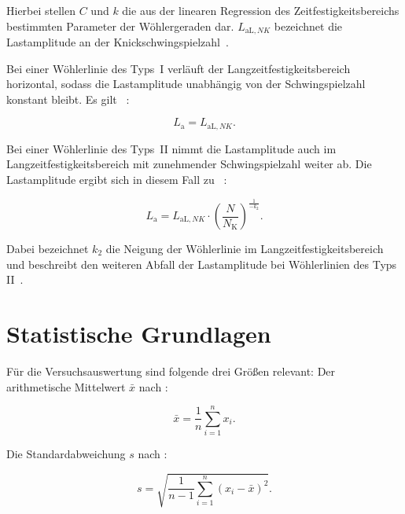Hierbei stellen \(C\) und \(k\) die aus der linearen Regression des Zeitfestigkeitsbereichs bestimmten Parameter der Wöhlergeraden dar. \(L_{\text{aL},NK}\) bezeichnet die Lastamplitude an der Knickschwingspielzahl~\cite[Seite~62]{DIN50100}.

Bei einer Wöhlerlinie des Typs~I verläuft der Langzeitfestigkeitsbereich horizontal, sodass die Lastamplitude unabhängig von der Schwingspielzahl konstant bleibt. Es gilt ~\cite[Seite~105]{DIN50100}:

\begin{equation} \label{eq:La_TypI} 
    L_{\text{a}} = L_{\text{aL},NK}.
\end{equation}

Bei einer Wöhlerlinie des Typs~II nimmt die Lastamplitude auch im Langzeitfestigkeitsbereich mit zunehmender Schwingspielzahl weiter ab. Die Lastamplitude ergibt sich in diesem Fall zu ~\cite[Seite~105]{DIN50100}:

\begin{equation} \label{eq:La_TypII} 
    L_{\text{a}} = L_{\text{aL},NK} \cdot \left(\frac{N}{N_{\text{K}}}\right)^{\frac{1}{-k_2}}.
\end{equation}

Dabei bezeichnet \(k_2\) die Neigung der Wöhlerlinie im Langzeitfestigkeitsbereich und beschreibt den weiteren Abfall der Lastamplitude bei Wöhlerlinien des Typs II~\cite[Seite~105]{DIN50100}.

\clearpage

	\section{Statistische Grundlagen}
	Für die Versuchsauswertung sind folgende drei Größen relevant: Der arithmetische Mittelwert $\bar{x}$ nach  \cite[Seite 23]{Statistik2018}:

    \begin{equation}\label{eq:Arithmetischer_Mittelwert}
   \bar{x} = \frac{1}{n} \sum_{i=1}^{n} x_i.
    \end{equation}
    
Die Standardabweichung $s$ nach  \cite[Seite 28]{Statistik2018}:

    \begin{equation}\label{eq:Standardabweichung}
   s = \sqrt{\frac{1}{n-1} \sum_{i=1}^{n} (x_i - \bar{x})^2}.
    \end{equation}
    
